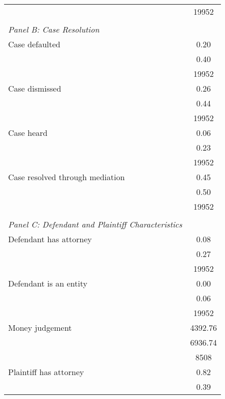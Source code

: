 \begin{table}[htbp]
\begin{tabular}{l*{1}{c}}
                    &       19952\\
\vspace{0.1em} \\ \emph{Panel B: Case Resolution}&            \\
\hspace{0.25cm}Case defaulted&        0.20\\
                    &        0.40\\
                    &       19952\\
\hspace{0.25cm}Case dismissed&        0.26\\
                    &        0.44\\
                    &       19952\\
\hspace{0.25cm}Case heard&        0.06\\
                    &        0.23\\
                    &       19952\\
\hspace{0.25cm}Case resolved through mediation&        0.45\\
                    &        0.50\\
                    &       19952\\
\vspace{0.1em} \\ \emph{Panel C: Defendant and Plaintiff Characteristics}&            \\
\hspace{0.25cm}Defendant has attorney&        0.08\\
                    &        0.27\\
                    &       19952\\
\hspace{0.25cm}Defendant is an entity&        0.00\\
                    &        0.06\\
                    &       19952\\
\hspace{0.25cm}Money judgement&     4392.76\\
                    &     6936.74\\
                    &        8508\\
\hspace{0.25cm}Plaintiff has attorney&        0.82\\
                    &        0.39\\

\end{tabular}
\end{table}
